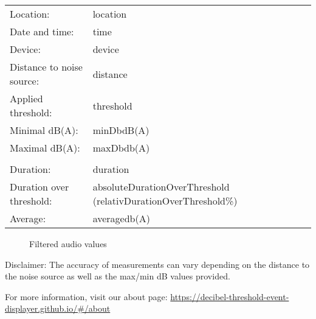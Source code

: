 \documentclass{article}
\begin{document}
\thispagestyle{empty}

\begin{table}[h]
    \centering
    \begin{tabular}{l l}
        Location:  & {{location}}  \\
        Date and time:      & {{time}}      \\
        Device:    & {{device}}    \\
        Distance to noise source:  & {{distance}}  \\
        Applied threshold: & {{threshold}} \\
        Minimal dB(A):     & {{minDb}}dB(A)     \\
        Maximal dB(A):     & {{maxDb}}db(A)     \\
                                        \\
        Duration: & {{duration}}\\
        Duration over threshold: & {{absoluteDurationOverThreshold}} ({{relativDurationOverThreshold}}\%) \\
        Average: & {{average}}db(A) \\
    \end{tabular}
    \label{tab:table}
\end{table}

\begin{figure}[h!]
    \begin{center}
        \caption{Filtered audio values}
    \end{center}
    \label{fig:figure}
\end{figure}

Disclaimer: The accuracy of measurements can vary depending on the distance to the noise source as well as the max/min dB values provided.

For more information, visit our about page: \url{https://decibel-threshold-event-displayer.github.io/#/about}
\end{document}
